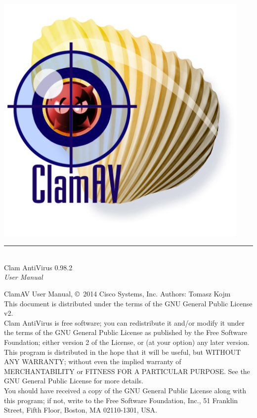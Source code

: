 \documentclass[a4paper,titlepage,12pt]{article}
\date{}
\begin{document}
    \setcounter{page}{0}

    \pagestyle{empty}
    \includegraphics[width=353pt]{clam}
    \vspace{3cm}
    \begin{flushright}
	\rule[-1ex]{8cm}{3pt}\\
	\huge Clam AntiVirus 0.98.2\\
	\huge \emph{User Manual}\\
    \end{flushright}

    \newpage
    \pagestyle{fancy}
    \tableofcontents
    \vspace{1.0cm}

    \noindent
    \begin{boxedminipage}[b]{\textwidth}
    ClamAV User Manual,
    \copyright \  2014 Cisco Systems, Inc.
    Authors: Tomasz Kojm\\
    This document is distributed under the terms of the GNU General
    Public License v2.\\

    Clam AntiVirus is free software; you can redistribute it and/or modify
    it under the terms of the GNU General Public License as published by
    the Free Software Foundation; either version 2 of the License, or
    (at your option) any later version.\\

    This program is distributed in the hope that it will be useful,
    but WITHOUT ANY WARRANTY; without even the implied warranty of
    MERCHANTABILITY or FITNESS FOR A PARTICULAR PURPOSE.  See the
    GNU General Public License for more details.\\

    You should have received a copy of the GNU General Public License
    along with this program; if not, write to the Free Software
    Foundation, Inc., 51 Franklin Street, Fifth Floor, Boston,
    MA 02110-1301, USA.
    \end{boxedminipage}
\end{document}
